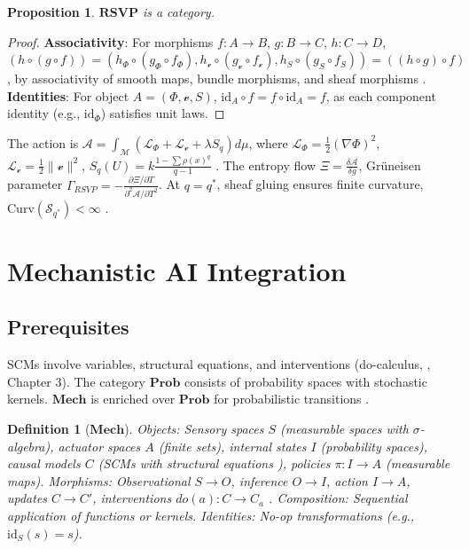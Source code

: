 \documentclass{article}
\newtheorem{proposition}{Proposition}
\newtheorem{definition}{Definition}
\begin{document}
\begin{proposition}
$\mathbf{RSVP}$ is a category.
\end{proposition}
\begin{proof}
\textbf{Associativity}: For morphisms $f: A \to B$, $g: B \to C$, $h: C \to D$, $(h \circ (g \circ f)) = (h_\Phi \circ (g_\Phi \circ f_\Phi), h_\mathcal{v} \circ (g_\mathcal{v} \circ f_\mathcal{v}), h_S \circ (g_S \circ f_S)) = ((h \circ g) \circ f)$, by associativity of smooth maps, bundle morphisms, and sheaf morphisms \cite{Kock2004, MacLane1992}. \textbf{Identities}: For object $A = (\Phi, \mathcal{v}, S)$, $\text{id}_A \circ f = f \circ \text{id}_A = f$, as each component identity (e.g., $\text{id}_\Phi$) satisfies unit laws.
\end{proof}

The action is $\mathcal{A} = \int_{\mathcal{M}} (\mathcal{L}_\Phi + \mathcal{L}_\mathcal{v} + \lambda S_q) d\mu$, where $\mathcal{L}_\Phi = \frac{1}{2}(\nabla \Phi)^2$, $\mathcal{L}_\mathcal{v} = \frac{1}{2}\|\mathcal{v}\|^2$, $S_q(U) = k \frac{1 - \sum \rho(x)^q}{q-1}$ \cite{Tsallis1988}. The entropy flow $\Xi = \frac{\delta \mathcal{A}}{\delta g}$, Grüneisen parameter $\Gamma_{RSVP} = - \frac{\partial \Xi / \partial T}{\partial^2 \mathcal{A} / \partial T^2}$. At $q = q^*$, sheaf gluing ensures finite curvature, $\text{Curv}(\mathcal{S}_{q^*}) < \infty$ \cite{Soares2024}.

\section{Mechanistic AI Integration}

\subsection{Prerequisites}
SCMs involve variables, structural equations, and interventions (do-calculus, \cite{Pearl2009}, Chapter 3). The category $\mathbf{Prob}$ consists of probability spaces with stochastic kernels. $\mathbf{Mech}$ is enriched over $\mathbf{Prob}$ for probabilistic transitions \cite{Lawvere2009}.

\begin{definition}[$\mathbf{Mech}$]
Objects: Sensory spaces $S$ (measurable spaces with $\sigma$-algebra), actuator spaces $A$ (finite sets), internal states $I$ (probability spaces), causal models $C$ (SCMs with structural equations \cite{Pearl2009}), policies $\pi: I \to A$ (measurable maps). Morphisms: Observational $S \to O$, inference $O \to I$, action $I \to A$, updates $C \to C'$, interventions $do(a): C \to C_a$ \cite{Pearl2009}. Composition: Sequential application of functions or kernels. Identities: No-op transformations (e.g., $\text{id}_S(s) = s$).
\end{definition}
\end{document}
